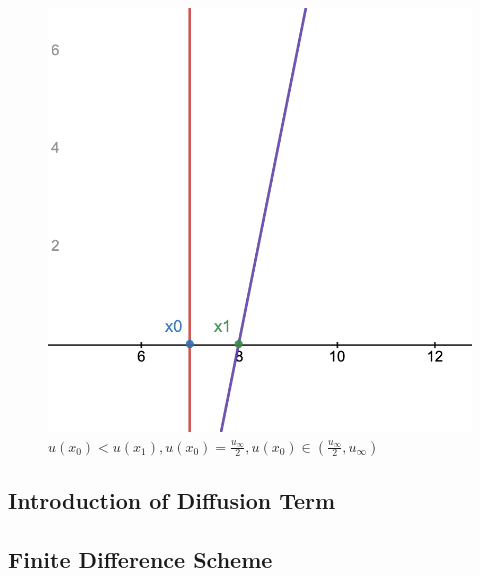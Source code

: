 \documentclass[12pt]{article}
\begin{document}
\begin{figure}[!htb]
    \caption{$u(x_0) > u(x_1), u(x_0), u(x_1) \in (\frac{u_\infty}{2}, u_\infty)$}\label{fig:no_shock_x1_x2_gt_half}
    \endminipage\hfill
    \includegraphics[width=\linewidth]{figures/no_shock_x0_eq_half.png}
    \caption{$u(x_0) < u(x_1), u(x_0) = \frac{u_\infty}{2},  u(x_0) \in (\frac{u_\infty}{2}, u_\infty) $}\label{fig:no_shock_x0_eq_half}
    \endminipage
\end{figure}

%
%
%

\subsection{Introduction of Diffusion Term}

\subsection{Finite Difference Scheme}
\end{document}
